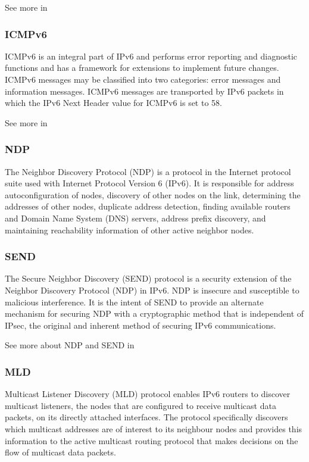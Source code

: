 See more in \cite{IPsec}

\subsubsection{ICMPv6}
ICMPv6 is an integral part of IPv6 and performs error reporting and diagnostic functions and has a framework for extensions to implement future changes. ICMPv6 messages may be classified into two categories: error messages and information messages. ICMPv6 messages are transported by IPv6 packets in which the IPv6 Next Header value for ICMPv6 is set to 58.

See more in \cite{ICMP}

\subsubsection{NDP}
The Neighbor Discovery Protocol (NDP) is a protocol in the Internet protocol suite used with Internet Protocol Version 6 (IPv6). It is responsible for address autoconfiguration of nodes, discovery of other nodes on the link, determining the addresses of other nodes, duplicate address detection, finding available routers and Domain Name System (DNS) servers, address prefix discovery, and maintaining reachability information of other active neighbor nodes.

\subsubsection{SEND}
The Secure Neighbor Discovery (SEND) protocol is a security extension of the Neighbor Discovery Protocol (NDP) in IPv6. NDP is insecure and susceptible to malicious interference. It is the intent of SEND to provide an alternate mechanism for securing NDP with a cryptographic method that is independent of IPsec, the original and inherent method of securing IPv6 communications.

See more about NDP and SEND in \cite{NDP_SEND}

\subsubsection{MLD}
Multicast Listener Discovery (MLD) protocol enables IPv6 routers to discover multicast listeners, the nodes that are configured to receive multicast data packets, on its directly attached interfaces. The protocol specifically discovers which multicast addresses are of interest to its neighbour nodes and provides this information to the active multicast routing protocol that makes decisions on the flow of multicast data packets. 

